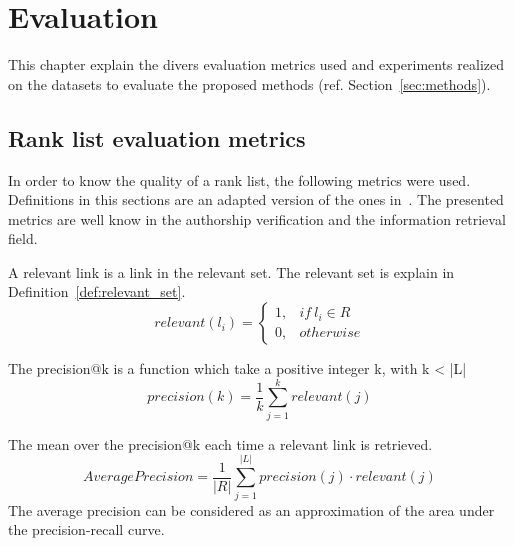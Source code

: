 \section{Evaluation \label{sec:evaluation}}

This chapter explain the divers evaluation metrics used and experiments realized on the datasets to evaluate the proposed methods (ref. Section~\ref{sec:methods}).

\subsection{Rank list evaluation metrics}
\label{sec:rl_eval}

In order to know the quality of a rank list, the following metrics were used.
Definitions in this sections are an adapted version of the ones in~\cite{kocher_linking}.
The presented metrics are well know in the authorship verification and the information retrieval field.

\begin{definition}
  A relevant link is a link in the relevant set.
  The relevant set is explain in Definition~\ref{def:relevant_set}.
  \begin{equation}
    relevant(l_i) =
    \begin{cases}
      1, & if\ l_i \in R \\
      0, & otherwise
    \end{cases}
  \end{equation}
\end{definition}

\begin{definition}
  The precision@k is a function which take a positive integer k, with k < |L|
  \begin{equation}
    precision(k) = \frac{1}{k} \sum_{j=1}^{k} relevant(j)
  \end{equation}
\end{definition}

\begin{definition}
  The mean over the precision@k each time a relevant link is retrieved.
  \begin{equation}
    AveragePrecision = \frac{1}{|R|} \sum_{j=1}^{|L|} precision(j) \cdot relevant(j)
  \end{equation}
  The average precision can be considered as an approximation of the area under the precision-recall curve.
\end{definition}

